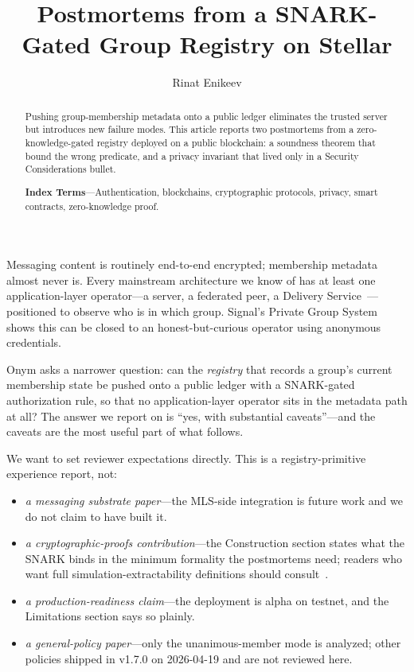\documentclass{IEEEcsmag}
\providecommand{\chapteri}[1]{\lettrine[lines=2,findent=2pt,nindent=0pt]{#1}{}}
\begin{document}

\title{Postmortems from a SNARK-Gated Group Registry on Stellar}

\author{Rinat Enikeev}


\begin{abstract}Pushing group-membership metadata onto a public ledger eliminates the trusted server but introduces new failure modes. This article reports two postmortems from a zero-knowledge-gated registry deployed on a public blockchain: a soundness theorem that bound the wrong predicate, and a privacy invariant that lived only in a Security Considerations bullet.

\vspace{4pt}\noindent\textbf{Index Terms}---Authentication, blockchains, cryptographic protocols, privacy, smart contracts, zero-knowledge proof.
\end{abstract}

\maketitle


\chapteri{M}essaging content is routinely end-to-end encrypted; membership metadata almost never is. Every mainstream architecture we know of has at least one application-layer operator---a server, a federated peer, a Delivery Service~\cite{rfc9420}---positioned to observe who is in which group. Signal's Private Group System~\cite{chase2020} shows this can be closed to an honest-but-curious operator using anonymous credentials.

Onym asks a narrower question: can the \emph{registry} that records a group's current membership state be pushed onto a public ledger with a SNARK-gated authorization rule, so that no application-layer operator sits in the metadata path at all? The answer we report on is ``yes, with substantial caveats''---and the caveats are the most useful part of what follows.

We want to set reviewer expectations directly. This is a registry-primitive experience report, not:
\begin{itemize}
\item \emph{a messaging substrate paper}---the MLS-side integration is future work and we do not claim to have built it.
\item \emph{a cryptographic-proofs contribution}---the Construction section states what the SNARK binds in the minimum formality the postmortems need; readers who want full simulation-extractability definitions should consult~\cite{baghery2021,lipmaa2019,fuchsbauer2018agm}.
\item \emph{a production-readiness claim}---the deployment is alpha on testnet, and the Limitations section says so plainly.
\item \emph{a general-policy paper}---only the unanimous-member mode is analyzed; other policies shipped in v1.7.0 on 2026-04-19 and are not reviewed here.
\end{itemize}
\end{document}
